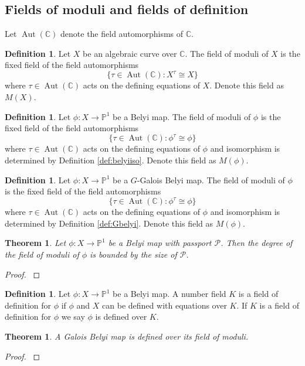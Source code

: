 \documentclass{dcthesis}
\newcommand{\PP}{\mathbb P}
\newcommand{\CC}{\mathbb C}
\newcommand{\defi}[1]{\textsf{#1}}
\DeclareMathOperator{\Aut}{Aut}
\newtheorem{theorem}[prop]{Theorem}
\theoremstyle{definition}
\newtheorem{definition}[prop]{Definition}
\theoremstyle{remark}
\numberwithin{equation}{section}
\numberwithin{figure}{section}
\begin{document}
{{    \subsection{Fields of moduli and fields of definition}{\label{subsec:fieldsofmodulifieldsofdefinition}
      Let $\Aut(\CC)$ denote the field automorphisms of $\CC$.
      \begin{definition}
        \label{def:fieldofmoduli}
        Let $X$ be an algebraic curve over $\CC$.
        The \defi{field of moduli} of $X$ is the fixed field of the
        field automorphisms
        \[
          \{\tau\in\Aut(\CC) : X^\tau\cong X\}
        \]
        where $\tau\in\Aut(\CC)$ acts on the defining equations of $X$.
        Denote this field as $M(X)$.
      \end{definition}
      \begin{definition}
        \label{def:fieldofmodulibelyimap}
        Let $\phi\colon X\to\PP^1$ be a Belyi map.
        The \defi{field of moduli} of $\phi$ is the fixed field of the
        field automorphisms
        \[
          \{\tau\in\Aut(\CC) : \phi^\tau\cong \phi\}
        \]
        where $\tau\in\Aut(\CC)$ acts on the defining equations of $\phi$
        and isomorphism is determined by
        Definition \ref{def:belyiiso}.
        Denote this field as $M(\phi)$.
      \end{definition}
      \begin{definition}
        \label{def:fieldofmoduliGbelyimap}
        Let $\phi\colon X\to\PP^1$ be a $G$-Galois Belyi map.
        The \defi{field of moduli} of $\phi$ is the fixed field of the
        field automorphisms
        \[
          \{\tau\in\Aut(\CC) : \phi^\tau\cong \phi\}
        \]
        where $\tau\in\Aut(\CC)$ acts on the defining equations of $\phi$
        and isomorphism is determined by
        Definition \ref{def:Gbelyi}.
        Denote this field as $M(\phi)$.
      \end{definition}
      \begin{theorem}\label{thm:fieldofmoduli}
        Let $\phi:X\to\PP^1$ be a Belyi map
        with passport $\mathcal{P}$.
        Then the degree of the field of moduli of $\phi$
        is bounded by the size of $\mathcal{P}$.
      \end{theorem}
      \begin{proof}
        \cite{SV}
      \end{proof}
      \begin{definition}
        \label{def:fieldofdefinition}
        Let $\phi\colon X\to\PP^1$ be a Belyi map.
        A number field $K$ is a
        \defi{field of definition} for $\phi$
        if $\phi$ and $X$ can be defined
        with equations over $K$.
        If $K$ is a field of definition for $\phi$
        we say $\phi$ is \defi{defined over} $K$.
      \end{definition}
      \begin{theorem}
        \label{thm:galoisbelyimapoverfieldofmoduli}
        A Galois Belyi map is defined over
        its field of moduli.
      \end{theorem}
      \begin{proof}
        \cite[Lemma 4.1]{triangles}
      \end{proof}
    }
  }
}
\end{document}
